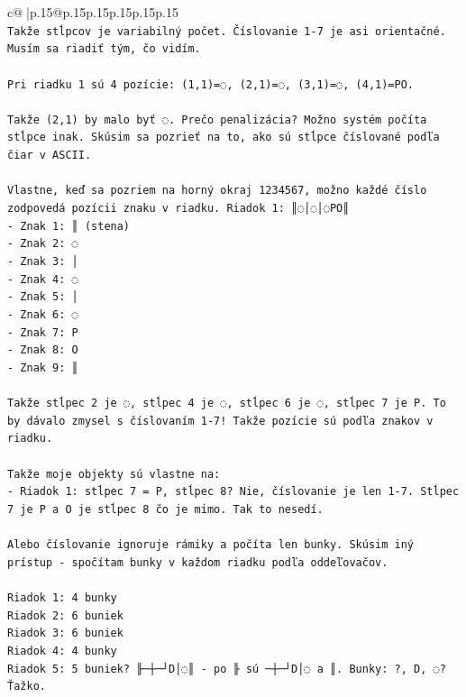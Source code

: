 \documentclass{article}
\begin{document}
{\begin{supertabular}{c@{$\;$}|p{.15\linewidth}@{}p{.15\linewidth}p{.15\linewidth}p{.15\linewidth}p{.15\linewidth}p{.15\linewidth}}
{{{\\ 
\texttt{Takže stĺpcov je variabilný počet. Číslovanie 1{-}7 je asi orientačné. Musím sa riadiť tým, čo vidím.} \\
\\ 
\texttt{Pri riadku 1 sú 4 pozície: (1,1)=◌, (2,1)=◌, (3,1)=◌, (4,1)=PO.} \\
\\ 
\texttt{Takže (2,1) by malo byť ◌. Prečo penalizácia? Možno systém počíta stĺpce inak. Skúsim sa pozrieť na to, ako sú stĺpce číslované podľa čiar v ASCII.} \\
\\ 
\texttt{Vlastne, keď sa pozriem na horný okraj  1234567, možno každé číslo zodpovedá pozícii znaku v riadku. Riadok 1: ║◌│◌│◌PO║} \\
\texttt{{-} Znak 1: ║ (stena)} \\
\texttt{{-} Znak 2: ◌} \\
\texttt{{-} Znak 3: │} \\
\texttt{{-} Znak 4: ◌} \\
\texttt{{-} Znak 5: │} \\
\texttt{{-} Znak 6: ◌} \\
\texttt{{-} Znak 7: P} \\
\texttt{{-} Znak 8: O} \\
\texttt{{-} Znak 9: ║} \\
\\ 
\texttt{Takže stĺpec 2 je ◌, stĺpec 4 je ◌, stĺpec 6 je ◌, stĺpec 7 je P. To by dávalo zmysel s číslovaním 1{-}7! Takže pozície sú podľa znakov v riadku. } \\
\\ 
\texttt{Takže moje objekty sú vlastne na:} \\
\texttt{{-} Riadok 1: stĺpec 7 = P, stĺpec 8? Nie, číslovanie je len 1{-}7. Stĺpec 7 je P a O je stĺpec 8 čo je mimo. Tak to nesedí.} \\
\\ 
\texttt{Alebo číslovanie ignoruje rámiky a počíta len bunky. Skúsim iný prístup {-} spočítam bunky v každom riadku podľa oddeľovačov.} \\
\\ 
\texttt{Riadok 1: 4 bunky} \\
\texttt{Riadok 2: 6 buniek} \\
\texttt{Riadok 3: 6 buniek} \\
\texttt{Riadok 4: 4 bunky} \\
\texttt{Riadok 5: 5 buniek? ╟─┼─┘D│◌║ {-} po ╟ sú ─┼─┘D│◌ a ║. Bunky: ?, D, ◌? Ťažko.} \\
}}}
\end{supertabular}}
\end{document}
